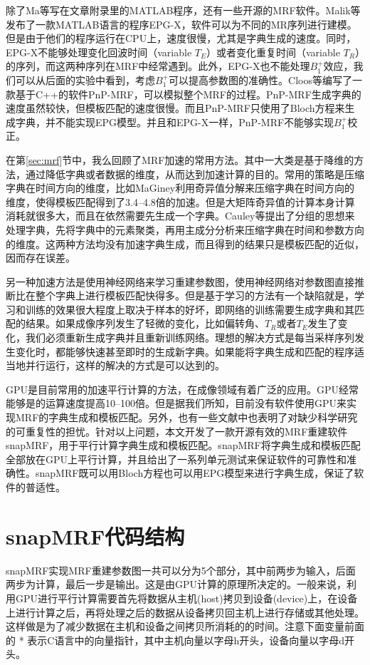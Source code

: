 除了Ma等\cite{mrf}写在文章附录里的MATLAB程序，还有一些开源的MRF软件。Malik等\cite{malik_extended_2018}发布了一款MATLAB语言的程序EPG-X，软件可以为不同的MR序列进行建模。但是由于他们的程序运行在CPU上，速度很慢，尤其是字典生成的速度。同时，EPG-X不能够处理变化回波时间（variable $T_E$）或者变化重复时间（variable $T_R$）的序列，而这两种序列在MRF中经常遇到。此外，EPG-X也不能处理$B_1^+$效应，我们可以从后面的实验中看到，考虑$B_1^+$可以提高参数图的准确性。Cloos\cite{cline2017air}等编写了一款基于C++的软件PnP-MRF，可以模拟整个MRF的过程。PnP-MRF生成字典的速度虽然较快，但模板匹配的速度很慢。而且PnP-MRF只使用了Bloch方程来生成字典，并不能实现EPG模型。并且和EPG-X一样，PnP-MRF不能够实现$B_1^+$校正。

在第\ref{sec:mrf}节中，我么回顾了MRF加速的常用方法。其中一大类是基于降维的方法，通过降低字典或者数据的维度，从而达到加速计算的目的。常用的策略是压缩字典在时间方向的维度，比如MaGiney\cite{svdmrf}利用奇异值分解来压缩字典在时间方向的维度，使得模板匹配得到了3.4--4.8倍的加速。但是大矩阵奇异值的计算本身计算消耗就很多大，而且在依然需要先生成一个字典。Cauley等\cite{groupingmrf}提出了分组的思想来处理字典，先将字典中的元素聚类，再用主成分分析来压缩字典在时间和参数方向的维度。这两种方法均没有加速字典生成，而且得到的结果只是模板匹配的近似，因而存在误差。

另一种加速方法是使用神经网络来学习重建参数图\cite{cohen2018mr}，使用神经网络对参数图直接推断比在整个字典上进行模板匹配快得多。但是基于学习的方法有一个缺陷就是，学习和训练的效果很大程度上取决于样本的好坏，即网络的训练需要生成字典和其匹配的结果。如果成像序列发生了轻微的变化，比如偏转角、$T_R$或者$T_E$发生了变化，我们必须重新生成字典并且重新训练网络。理想的解决方式是每当采样序列发生变化时，都能够快速甚至即时的生成新字典。如果能将字典生成和匹配的程序适当地并行运行，这样的解决的方式是可以达到的。

GPU是目前常用的加速平行计算的方法，在成像领域有着广泛的应用\cite{Knoll,gpu,Sorensen,tron}。GPU经常能够是的运算速度提高10--100倍。但是据我们所知，目前没有软件使用GPU来实现MRF的字典生成和模板匹配。另外，也有一些文献中也表明了对缺少科学研究的可重复性的担忧\cite{vasilevsy_repro_2013,osc_repro_2015,collins_repro_2014,begley_repro_2015}。针对以上问题，本文开发了一款开源有效的MRF重建软件snapMRF，用于平行计算字典生成和模板匹配。snapMRF将字典生成和模板匹配全部放在GPU上平行计算，并且给出了一系列单元测试来保证软件的可靠性和准确性。snapMRF既可以用Bloch方程也可以用EPG模型来进行字典生成，保证了软件的普适性。

\section{snapMRF代码结构}
snapMRF实现MRF重建参数图一共可以分为5个部分，其中前两步为输入，后面两步为计算，最后一步是输出。这是由GPU计算的原理所决定的。一般来说，利用GPU进行平行计算需要首先将数据从主机(host)拷贝到设备(device)上，在设备上进行计算之后，再将处理之后的数据从设备拷贝回主机上进行存储或其他处理。这样做是为了减少数据在主机和设备之间拷贝所消耗的的时间。注意下面变量前面的 * 表示C语言中的向量指针，其中主机向量以字母h开头，设备向量以字母d开头。

